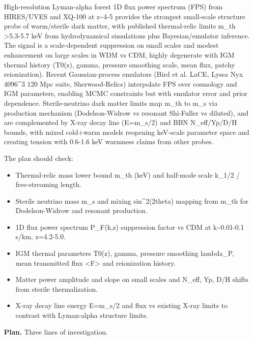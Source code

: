 \documentclass[11pt,a4paper]{article}
\begin{document}
High-resolution Lyman-alpha forest 1D flux power spectrum (FPS) from HIRES/UVES and XQ-100 at z\textasciitilde{}4-5 provides the strongest small-scale structure probe of warm/sterile dark matter, with published thermal-relic limits m\_th \textgreater{}5.3-5.7 keV from hydrodynamical simulations plus Bayesian/emulator inference. The signal is a scale-dependent suppression on small scales and modest enhancement on large scales in WDM vs CDM, highly degenerate with IGM thermal history (T0(z), gamma, pressure smoothing scale, mean flux, patchy reionization). Recent Gaussian-process emulators (Bird et al. LaCE, Lyssa Nyx 4096\textasciicircum{}3 120 Mpc suite, Sherwood-Relics) interpolate FPS over cosmology and IGM parameters, enabling MCMC constraints but with emulator error and prior dependence. Sterile-neutrino dark matter limits map m\_th to m\_s via production mechanism (Dodelson-Widrow vs resonant Shi-Fuller vs diluted), and are complemented by X-ray decay line (E=m\_s/2) and BBN N\_eff/Yp/D/H bounds, with mixed cold+warm models reopening keV-scale parameter space and creating tension with 0.6-1.6 keV warmness claims from other probes.

The plan should check:

\begin{itemize}
  \item Thermal-relic mass lower bound m\_th (keV) and half-mode scale k\_1/2 / free-streaming length.
  \item Sterile neutrino mass m\_s and mixing sin\textasciicircum{}2(2theta) mapping from m\_th for Dodelson-Widrow and resonant production.
  \item 1D flux power spectrum P\_F(k,z) suppression factor vs CDM at k\textasciitilde{}0.01-0.1 s/km, z=4.2-5.0.
  \item IGM thermal parameters T0(z), gamma, pressure smoothing lambda\_P, mean transmitted flux \textless{}F\textgreater{} and reionization history.
  \item Matter power amplitude and slope on small scales and N\_eff, Yp, D/H shifts from sterile thermalization.
  \item X-ray decay line energy E=m\_s/2 and flux vs existing X-ray limits to contrast with Lyman-alpha structure limits.
\end{itemize}
\textbf{Plan.} Three lines of investigation.
\end{document}
